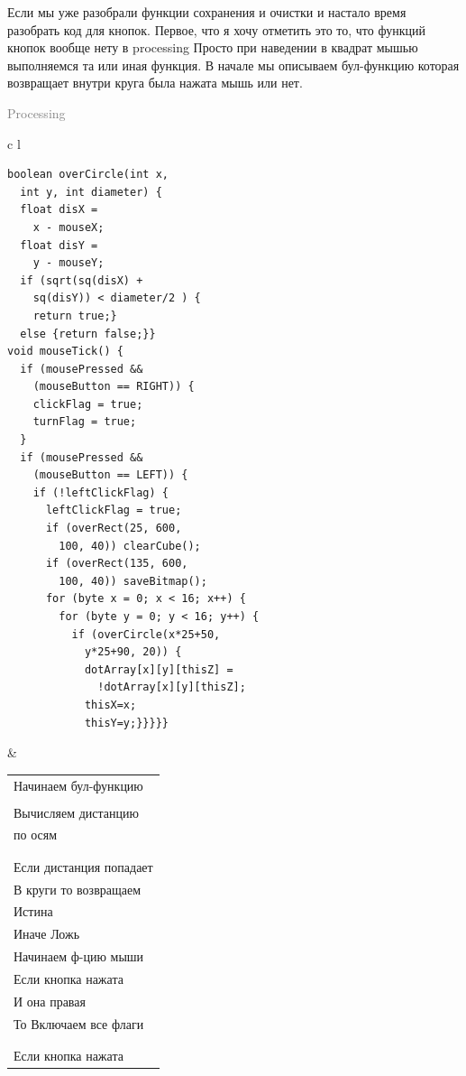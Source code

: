 \documentclass[a4paper, 12pt]{article}
\begin{document}
Если мы уже разобрали функции сохранения и очистки и настало время разобрать
код для кнопок. Первое, что я хочу отметить это то, что функций кнопок вообще 
нету в processing Просто при наведении в квадрат мышью выполняемся та или иная 
функция. В начале мы описываем бул-функцию которая возвращает внутри круга была 
нажата мышь или нет.

\begin{flushright}\begin{huge}\textcolor{grey}{Processing}\end{huge}\end{flushright}
\begin{tabular}{c l}
\hline
\begin{lstlisting}[style=pmyLatexStyle]
boolean overCircle(int x, 
  int y, int diameter) {
  float disX = 
    x - mouseX;
  float disY = 
    y - mouseY;
  if (sqrt(sq(disX) + 
    sq(disY)) < diameter/2 ) {
    return true;} 
  else {return false;}}
void mouseTick() {
  if (mousePressed && 
    (mouseButton == RIGHT)) {
    clickFlag = true;
    turnFlag = true;
  }
  if (mousePressed && 
    (mouseButton == LEFT)) {
    if (!leftClickFlag) {
      leftClickFlag = true;
      if (overRect(25, 600,
        100, 40)) clearCube();
      if (overRect(135, 600,
        100, 40)) saveBitmap();
      for (byte x = 0; x < 16; x++) {
        for (byte y = 0; y < 16; y++) {
          if (overCircle(x*25+50,
            y*25+90, 20)) {
            dotArray[x][y][thisZ] = 
              !dotArray[x][y][thisZ];
            thisX=x;
            thisY=y;}}}}}
\end{lstlisting}
&
\begin{tabular}{l}
Начинаем бул-функцию\\
\\
Вычисляем дистанцию\\ 
по осям\\
\\
\\
Если дистанция попадает\\
В круги то возвращаем\\
Истина \\
Иначе Ложь\\
Начинаем ф-цию мыши\\
Если кнопка нажата\\
И она правая\\
То Включаем все флаги\\
\\
\\
Если кнопка нажата\\

\end{tabular}
\end{tabular}
\end{document}
